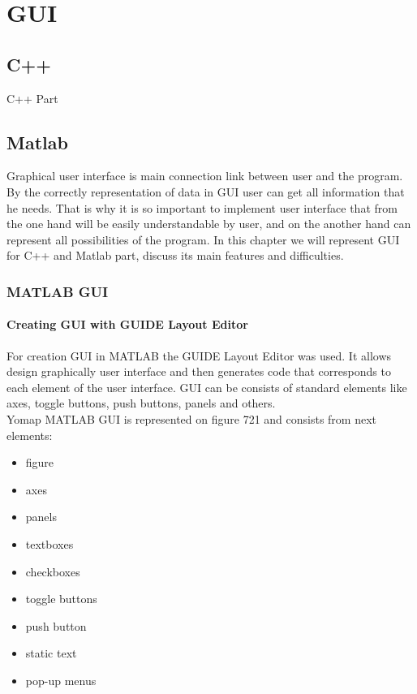 
\chapter{GUI} %

\label{Chapter8} %



\section{C++}
	C++ Part
\section{Matlab}
	Graphical user interface is main connection link between user and the program. By the correctly representation of data in GUI user can get all information that he needs. That is why it is so important to implement user interface that from the one hand will be easily understandable by user, and on the another hand can represent all possibilities of the program. In this chapter we will represent GUI for C++ and Matlab part, discuss its main features and difficulties.
	
	\subsection{MATLAB GUI}
	
		\subsubsection{Creating GUI with GUIDE Layout Editor}
			For creation GUI in MATLAB the GUIDE Layout Editor was used. It allows design graphically user interface and then generates code that corresponds to each element of the user interface. GUI can be consists of standard elements like axes, toggle buttons, push buttons, panels and others.\\
			
			Yomap MATLAB GUI is represented on figure 721 and consists from next elements:
			\begin{itemize}
				\item figure
				\item axes
				\item panels
				\item textboxes
				\item checkboxes
				\item toggle buttons
				\item push button
				\item static text
				\item pop-up menus
			\end{itemize}
			
